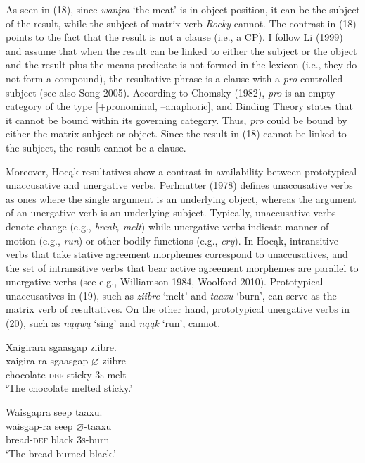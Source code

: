 \documentclass[output=paper]{LSP/langsci}
\begin{document}
As seen in (18), since \textit{wanįra} `the meat' is in object position, it can be the subject of the result, while the subject of matrix verb \textit{Rocky} cannot. The contrast in (18) points to the fact that the result is not a clause (i.e., a CP). I follow Li (1999) and assume that when the result can be linked to either the subject or the object and the result plus the means predicate is not formed in the lexicon (i.e., they do not form a compound), the resultative phrase is a clause with a \textit{pro}-controlled subject (see also Song 2005). According to Chomsky (1982), \textit{pro} is an empty category of the type [+pronominal, --anaphoric], and Binding Theory states that it cannot be bound within its governing category. Thus, \textit{pro} could be bound by either the matrix subject or object. Since the result in (18) cannot be linked to the subject, the result cannot be a clause.

Moreover, Hocąk resultatives show a contrast in availability between prototypical unaccusative and unergative verbs. Perlmutter (1978) defines unaccusative verbs as ones where the single argument is an underlying object, whereas the argument of an unergative verb is an underlying subject. Typically, unaccusative verbs denote change (e.g., \textit{break, melt}) while unergative verbs indicate manner of motion (e.g., \textit{run}) or other bodily functions (e.g., \textit{cry}). In Hocąk, intransitive verbs that take stative agreement morphemes correspond to unaccusatives, and the set of intransitive verbs that bear active agreement morphemes are parallel to unergative verbs (see e.g., Williamson 1984, Woolford 2010). Prototypical unaccusatives in (19), such as \textit{ziibre} `melt' and \textit{taaxu} `burn', can serve as the matrix verb of resultatives. On the other hand, prototypical unergative verbs in (20), such as \textit{nąąwą} `sing' and \textit{nąąk} `run', cannot.

\begin{exe}
\ex
\begin{xlist}

\ex \glll Xaigirara sgaasgap {ziibre}. \\
 xaigira-ra sgaasgap {$\varnothing$}-ziibre\\
chocolate-\textsc{def} sticky \textsc{3s}-melt\\
\glt `The chocolate melted sticky.'

\ex \glll Waisgapra seep {taaxu}.\\
 waisgap-ra seep {$\varnothing$}-taaxu\\
bread-\textsc{def} black \textsc{3s}-burn\\
\glt `The bread burned black.'

\end{xlist}
\end{exe}
\end{document}
